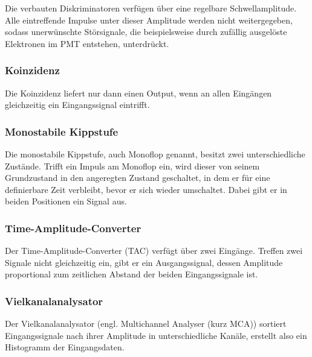 Die verbauten Diskriminatoren verfügen über eine regelbare Schwellamplitude. Alle eintreffende Impulse unter dieser Amplitude werden nicht weitergegeben, sodass unerwünschte Störsignale,
die beispielsweise durch zufällig ausgelöste Elektronen im PMT entstehen, unterdrückt.


\subsubsection{Koinzidenz}

Die Koinzidenz liefert nur dann einen Output, wenn an allen Eingängen gleichzeitig ein Eingangssignal eintrifft.


\subsubsection{Monostabile Kippstufe}

Die monostabile Kippstufe, auch Monoflop genannt, besitzt zwei unterschiedliche Zustände. Trifft ein Impuls am Monoflop ein, wird dieser von seinem Grundzustand in den angeregten Zustand geschaltet,
in dem er für eine definierbare Zeit verbleibt, bevor er sich wieder umschaltet. Dabei gibt er in beiden Positionen ein Signal aus.


\subsubsection{Time-Amplitude-Converter}

Der Time-Amplitude-Converter (TAC) verfügt über zwei Eingänge. Treffen zwei Signale nicht gleichzeitig ein, gibt er ein Ausgangssignal, dessen Amplitude proportional zum zeitlichen Abstand der beiden
Eingangssignale ist.


\subsubsection{Vielkanalanalysator}

Der Vielkanalanalysator (engl. Multichannel Analyser (kurz MCA)) sortiert Eingangssignale nach ihrer Amplitude in unterschiedliche Kanäle, erstellt also ein Histogramm der Eingangsdaten.





